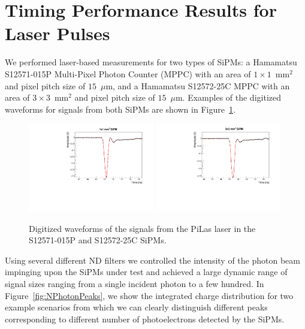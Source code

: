 \section{Timing Performance Results for Laser Pulses}
\label{sec:lasertiming}

We performed laser-based measurements for two types of SiPMs: a Hamamatsu
S12571-015P Multi-Pixel Photon Counter (MPPC) with an area of $1\times
1$~$\mathrm{mm}^{2}$ and pixel pitch size of $15$~$\mu$m, and a Hamamatsu
S12572-25C MPPC with an area of $3\times 3$~$\mathrm{mm}^{2}$ and pixel pitch
size of $15$~$\mu$m. Examples of the digitized waveforms for signals from both 
SiPMs are shown in Figure~\ref{fig:pulses}.

\begin{figure}[htbp] 
\centering
\includegraphics[width=0.49\textwidth]{figures/PulseShapeExample_1x1SiPM.pdf} 
\includegraphics[width=0.49\textwidth]{figures/PulseShapeExample_3x3SiPM.pdf} 
\caption{Digitized waveforms of the signals from the PiLas laser 
in the S12571-015P and S12572-25C SiPMs.} 
\label{fig:pulses} 
\end{figure} 

Using several different ND filters we controlled the intensity of the photon 
beam impinging upon the SiPMs under test and achieved a large dynamic range 
of signal sizes ranging from a single incident photon to a few hundred. In 
Figure~\ref{fig:NPhotonPeaks}, we show the integrated charge distribution
for two example scenarios from which we can clearly distinguish different peaks
corresponding to different number of photoelectrons detected by the SiPMs.

